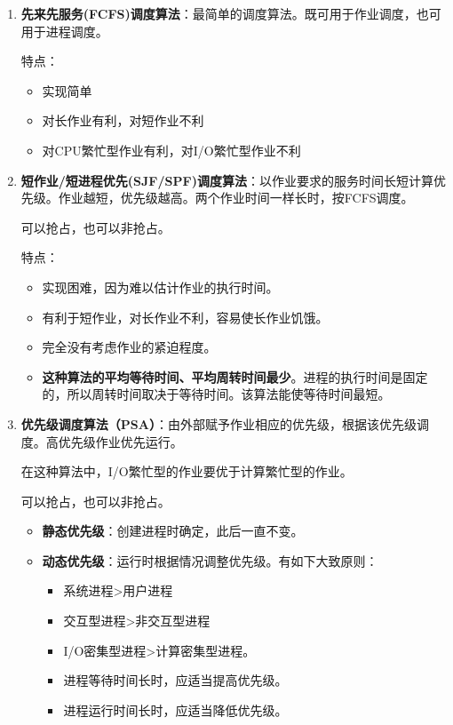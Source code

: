 \documentclass[12pt, a4paper, oneside]{ctexart}
\begin{document}
\begin{enumerate}
  \item {\bf 先来先服务(FCFS)调度算法}：最简单的调度算法。既可用于作业调度，也可用于进程调度。

  特点：
  \begin{itemize}
      \item 实现简单
      \item 对长作业有利，对短作业不利
      \item 对CPU繁忙型作业有利，对I/O繁忙型作业不利
  \end{itemize}

  \item {\bf 短作业/短进程优先(SJF/SPF)调度算法}：以作业要求的服务时间长短计算优先级。作业越短，优先级越高。两个作业时间一样长时，按FCFS调度。
  
  可以抢占，也可以非抢占。

  特点：
  \begin{itemize}
      \item 实现困难，因为难以估计作业的执行时间。
      \item 有利于短作业，对长作业不利，容易使长作业饥饿。
      \item 完全没有考虑作业的紧迫程度。
      \item \textbf{这种算法的平均等待时间、平均周转时间最少}。进程的执行时间是固定的，所以周转时间取决于等待时间。该算法能使等待时间最短。
  \end{itemize}

  \item {\bf 优先级调度算法（PSA）}：由外部赋予作业相应的优先级，根据该优先级调度。高优先级作业优先运行。
  
  在这种算法中，I/O繁忙型的作业要优于计算繁忙型的作业。

  可以抢占，也可以非抢占。

  \begin{itemize}
    \item {\bf 静态优先级}：创建进程时确定，此后一直不变。
    \item {\bf 动态优先级}：运行时根据情况调整优先级。有如下大致原则：
    \begin{itemize}
      \item 系统进程>用户进程
      \item 交互型进程>非交互型进程
      \item I/O密集型进程>计算密集型进程。
      \item 进程等待时间长时，应适当提高优先级。
      \item 进程运行时间长时，应适当降低优先级。
    \end{itemize}
  \end{itemize}
  

\end{enumerate}
\end{document}
